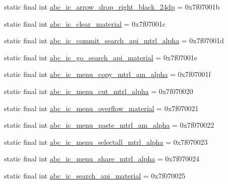 \begin{DoxyCompactItemize}
\item 
static final int \mbox{\hyperlink{classandroid_1_1support_1_1design_1_1R_1_1drawable_add406d0fcbe4ae94b5da1e3fa1965a4a}{abc\+\_\+ic\+\_\+arrow\+\_\+drop\+\_\+right\+\_\+black\+\_\+24dp}} = 0x7f07001b
\item 
static final int \mbox{\hyperlink{classandroid_1_1support_1_1design_1_1R_1_1drawable_ae63d299171687a72cf4d3224eaa77ef6}{abc\+\_\+ic\+\_\+clear\+\_\+material}} = 0x7f07001c
\item 
static final int \mbox{\hyperlink{classandroid_1_1support_1_1design_1_1R_1_1drawable_a6f2650927b8bc2de3aed0d6182fbdc1c}{abc\+\_\+ic\+\_\+commit\+\_\+search\+\_\+api\+\_\+mtrl\+\_\+alpha}} = 0x7f07001d
\item 
static final int \mbox{\hyperlink{classandroid_1_1support_1_1design_1_1R_1_1drawable_ac4daff2469a8455e90a0299184bdaf0c}{abc\+\_\+ic\+\_\+go\+\_\+search\+\_\+api\+\_\+material}} = 0x7f07001e
\item 
static final int \mbox{\hyperlink{classandroid_1_1support_1_1design_1_1R_1_1drawable_a2f5309e63474158ee7b801b97c57e75c}{abc\+\_\+ic\+\_\+menu\+\_\+copy\+\_\+mtrl\+\_\+am\+\_\+alpha}} = 0x7f07001f
\item 
static final int \mbox{\hyperlink{classandroid_1_1support_1_1design_1_1R_1_1drawable_a57f5209b3da1abe79340d6f761c086fe}{abc\+\_\+ic\+\_\+menu\+\_\+cut\+\_\+mtrl\+\_\+alpha}} = 0x7f070020
\item 
static final int \mbox{\hyperlink{classandroid_1_1support_1_1design_1_1R_1_1drawable_ac6c9781cb3f05911ad57d51dcb9a0720}{abc\+\_\+ic\+\_\+menu\+\_\+overflow\+\_\+material}} = 0x7f070021
\item 
static final int \mbox{\hyperlink{classandroid_1_1support_1_1design_1_1R_1_1drawable_a4e6ea049511edc786da2401ea1af7aa6}{abc\+\_\+ic\+\_\+menu\+\_\+paste\+\_\+mtrl\+\_\+am\+\_\+alpha}} = 0x7f070022
\item 
static final int \mbox{\hyperlink{classandroid_1_1support_1_1design_1_1R_1_1drawable_af61cd59ede2a2d0c843a247123154674}{abc\+\_\+ic\+\_\+menu\+\_\+selectall\+\_\+mtrl\+\_\+alpha}} = 0x7f070023
\item 
static final int \mbox{\hyperlink{classandroid_1_1support_1_1design_1_1R_1_1drawable_a63c9c5f3b9f430077d1b7fb19e37b279}{abc\+\_\+ic\+\_\+menu\+\_\+share\+\_\+mtrl\+\_\+alpha}} = 0x7f070024
\item 
static final int \mbox{\hyperlink{classandroid_1_1support_1_1design_1_1R_1_1drawable_a4a95e750125c3f61a6ae8d96137426ec}{abc\+\_\+ic\+\_\+search\+\_\+api\+\_\+material}} = 0x7f070025

\end{DoxyCompactItemize}
